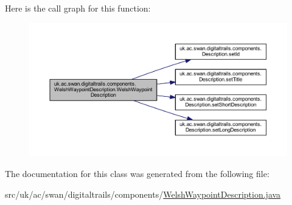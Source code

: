 Here is the call graph for this function\+:\nopagebreak
\begin{figure}[H]
\begin{center}
\leavevmode
\includegraphics[width=350pt]{classuk_1_1ac_1_1swan_1_1digitaltrails_1_1components_1_1_welsh_waypoint_description_abc99397f6f008f179abb0a89ab8c26a9_cgraph}
\end{center}
\end{figure}




The documentation for this class was generated from the following file\+:\begin{DoxyCompactItemize}
\item 
src/uk/ac/swan/digitaltrails/components/\hyperlink{_welsh_waypoint_description_8java}{Welsh\+Waypoint\+Description.\+java}\end{DoxyCompactItemize}
